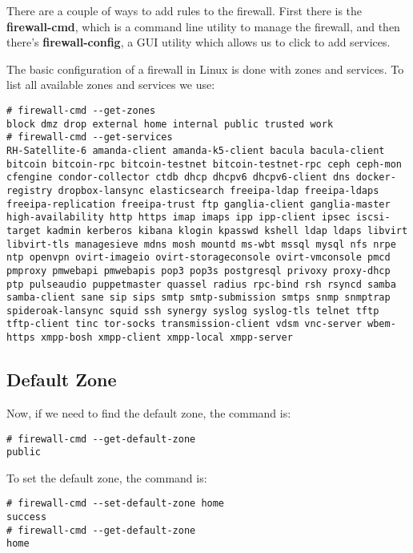 \noindent
There are a couple of ways to add rules to the firewall. First there is the \textbf{firewall-cmd}, which is a command line utility to manage the firewall, and then there's \textbf{firewall-config}, a GUI utility which allows us to click to add services. 

The basic configuration of a firewall in Linux is done with zones and services. To list all available zones and services we use:

\vspace{-15pt}
\begin{verbatim}
# firewall-cmd --get-zones
block dmz drop external home internal public trusted work
# firewall-cmd --get-services 
RH-Satellite-6 amanda-client amanda-k5-client bacula bacula-client bitcoin bitcoin-rpc bitcoin-testnet bitcoin-testnet-rpc ceph ceph-mon cfengine condor-collector ctdb dhcp dhcpv6 dhcpv6-client dns docker-registry dropbox-lansync elasticsearch freeipa-ldap freeipa-ldaps freeipa-replication freeipa-trust ftp ganglia-client ganglia-master high-availability http https imap imaps ipp ipp-client ipsec iscsi-target kadmin kerberos kibana klogin kpasswd kshell ldap ldaps libvirt libvirt-tls managesieve mdns mosh mountd ms-wbt mssql mysql nfs nrpe ntp openvpn ovirt-imageio ovirt-storageconsole ovirt-vmconsole pmcd pmproxy pmwebapi pmwebapis pop3 pop3s postgresql privoxy proxy-dhcp ptp pulseaudio puppetmaster quassel radius rpc-bind rsh rsyncd samba samba-client sane sip sips smtp smtp-submission smtps snmp snmptrap spideroak-lansync squid ssh synergy syslog syslog-tls telnet tftp tftp-client tinc tor-socks transmission-client vdsm vnc-server wbem-https xmpp-bosh xmpp-client xmpp-local xmpp-server
\end{verbatim}
\vspace{-10pt}

\subsection{Default Zone}
Now, if we need to find the default zone, the command is:

\vspace{-15pt}
\begin{verbatim}
# firewall-cmd --get-default-zone
public
\end{verbatim}
\vspace{-10pt}

\noindent
To set the default zone, the command is:

\vspace{-15pt}
\begin{verbatim}
# firewall-cmd --set-default-zone home
success
# firewall-cmd --get-default-zone
home
\end{verbatim}
\vspace{-10pt}

